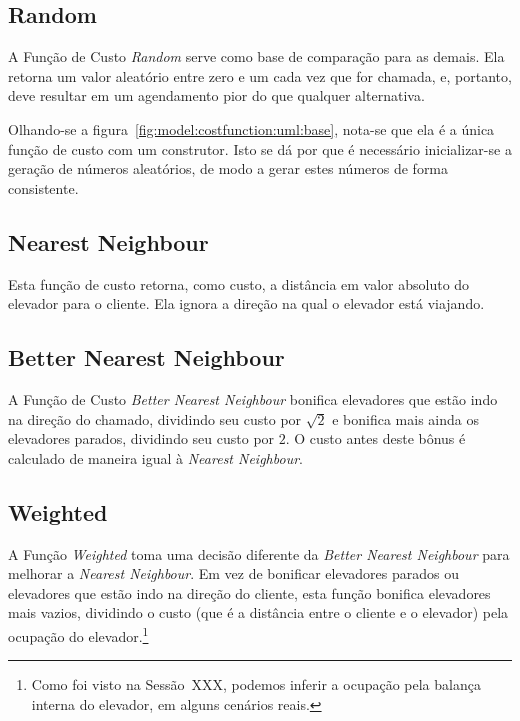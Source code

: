 \subsection{\label{model:costfunctions:random}Random}
A Função de Custo \textit{Random} serve como base de comparação para as demais.
Ela retorna um valor aleatório entre zero e um cada vez que for chamada, e,
portanto, deve resultar em um agendamento pior do que qualquer alternativa.

Olhando-se a figura~\ref{fig:model:costfunction:uml:base}, nota-se que ela é a
única função de custo com um construtor. Isto se dá por que é necessário
inicializar-se a geração de números aleatórios, de modo a gerar estes números de
forma consistente.

\subsection{\label{model:costfunctions:nn}Nearest Neighbour}
Esta função de custo retorna, como custo, a distância em valor absoluto do
elevador para o cliente. Ela ignora a direção na qual o elevador está viajando.


\subsection{\label{model:costfunctions:bnn}Better Nearest Neighbour}
A Função de Custo \textit{Better Nearest Neighbour} bonifica elevadores que
estão indo na direção do chamado, dividindo seu custo por $\sqrt 2$ e bonifica
mais ainda os elevadores parados, dividindo seu custo por $2$. O custo antes
deste bônus é calculado de maneira igual à \textit{Nearest Neighbour}.

\subsection{\label{model:costfunctions:weighted}Weighted}
A Função \textit{Weighted} toma uma decisão diferente da \textit{Better Nearest
  Neighbour} para melhorar a \textit{Nearest Neighbour}. Em vez de bonificar
elevadores parados ou elevadores que estão indo na direção do cliente, esta
função bonifica elevadores mais vazios, dividindo o custo (que é a distância
entre o cliente e o elevador) pela ocupação do elevador.\footnote{Como foi visto
na Sessão~XXX, podemos inferir a ocupação pela balança interna do elevador, em
alguns cenários reais.}

